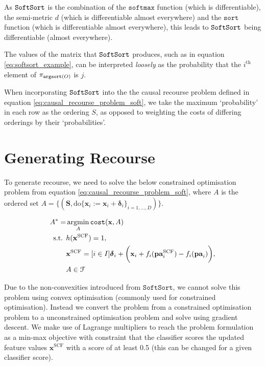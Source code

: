 As $\operatorname*{\texttt{SoftSort}}$ is the combination of the $\texttt{softmax}$ function (which is differentiable), the semi-metric $d$ (which is differentiable almost everywhere) and the $\texttt{sort}$ function (which is differentiable almost everywhere), this leads to $\operatorname*{\texttt{SoftSort}}$ being differentiable (almost everywhere).

The values of the matrix that $\operatorname*{\texttt{SoftSort}}$ produces, such as in equation \ref{eq:softsort_example}, can be interpreted \textit{loosely} as the probability that the $i^{\text{th}}$ element of $\pi_{\operatorname*{\texttt{argsort}}(O)}$ is $j$.

When incorporating $\operatorname*{\texttt{SoftSort}}$ into the the causal recourse problem defined in equation \ref{eq:causal_recourse_problem_soft}, we take the maximum `probability' in each row as the ordering $S$, as opposed to weighting the costs of differing orderings by their `probabilities'.

\section{Generating Recourse}

To generate recourse, we need to solve the below constrained optimisation problem from equation \ref{eq:causal_recourse_problem_soft}, where $A$ is the ordered set $A = \big\{(\mathbf{S}, \text{do} \{\mathbf{x}_i:=\mathbf{x}_i + \boldsymbol{\delta}_i\}_{i=1, \ldots, D})\big\}$.

\begin{align}
	A^* = & \operatorname*{argmin}_{A} \texttt{cost}(\mathbf{x}, A) \\ \nonumber
	\text{s.t. } & h(\mathbf{x}^{\text{SCF}}) = 1, \\ \nonumber
	& 	\mathbf{x}^{\text{SCF}} = [i \in I] \boldsymbol{\delta}_i + \bigg( \mathbf{x}_i + f_i(\textbf{pa}^{\text{SCF}}_i) - f_i(\textbf{pa}_i) \bigg), \\ \nonumber
	& A \in \mathcal{F}
\end{align} 

Due to the non-convexities introduced from $\texttt{SoftSort}$, we cannot solve this problem using convex optimisation (commonly used for constrained optimisation). Instead we convert the problem from a constrained optimisation problem to a unconstrained optimisation problem and solve using gradient descent. We make use of Lagrange multipliers to reach the problem formulation as a min-max objective with constraint that the classifier scores the updated feature values $\mathbf{x}^{\text{SCF}}$ with a score of at least 0.5 (this can be changed for a given classifier score).

